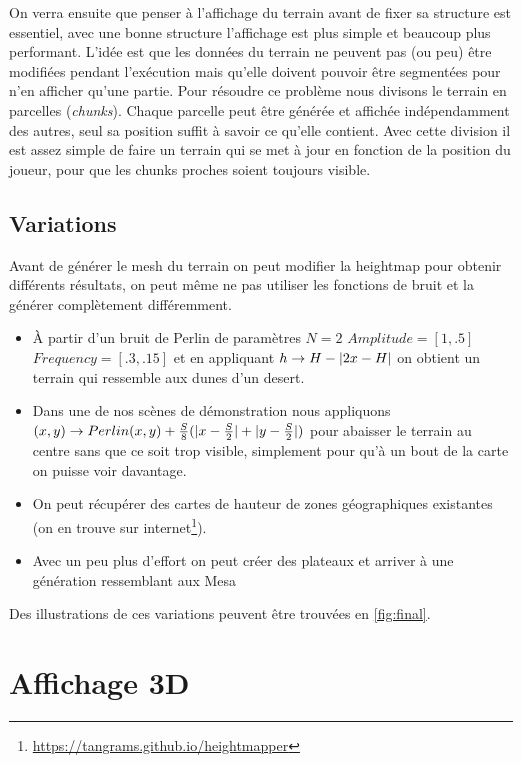 \documentclass{EPUProjetDi}
\DeclarePairedDelimiter\abs{\lvert}{\rvert}%
\begin{document}
On verra ensuite que penser à l'affichage du terrain avant de fixer sa structure est essentiel, avec une bonne structure l'affichage est plus simple et beaucoup plus performant. L'idée est que les données du terrain ne peuvent pas (ou peu) être modifiées pendant l'exécution mais qu'elle doivent pouvoir être segmentées pour n'en afficher qu'une partie.
Pour résoudre ce problème nous divisons le terrain en parcelles (\textit{chunks}). Chaque parcelle peut être générée et affichée indépendamment des autres, seul sa position suffit à savoir ce qu'elle contient.
Avec cette division il est assez simple de faire un terrain qui se met à jour en fonction de la position du joueur, pour que les chunks proches soient toujours visible.




\section{Variations}

Avant de générer le mesh du terrain on peut modifier la heightmap pour obtenir différents résultats, on peut même ne pas utiliser les fonctions de bruit et la générer complètement différemment.

\begin{itemize}
	\item{À partir d'un bruit de Perlin de paramètres $N=2$ $Amplitude=[1, .5]$ $Frequency=[.3, .15]$ et en appliquant $h\rightarrow H-\abs{2x-H}$ on obtient un terrain qui ressemble aux dunes d'un desert.}
	\item{Dans une de nos scènes de démonstration nous appliquons $(x,y)\rightarrow Perlin(x,y)+\frac{S}{8}(\abs{x-\frac{S}{2}}+\abs{y-\frac{S}{2}})$ pour abaisser le terrain au centre sans que ce soit trop visible, simplement pour qu'à un bout de la carte on puisse voir davantage.}
	\item{On peut récupérer des cartes de hauteur de zones géographiques existantes (on en trouve sur internet\footnote{\url{https://tangrams.github.io/heightmapper}}).}
	\item{Avec un peu plus d'effort on peut créer des plateaux et arriver à une génération ressemblant aux Mesa}
\end{itemize}

Des illustrations de ces variations peuvent être trouvées en \ref{fig:final}.


\chapter{Affichage 3D}
\end{document}
